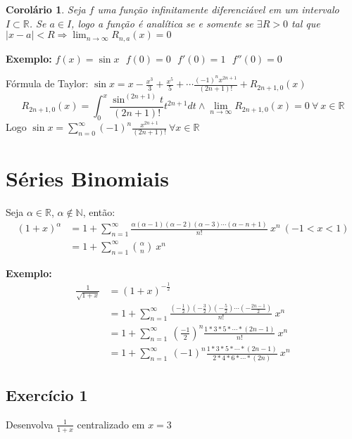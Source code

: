 \documentclass[12pt,openany, letterpaper]{book}
\newtheorem{corollary}{Corolário}[theorem]
\newcommand{\LI}[1][n]{\lim_{{#1} \rightarrow \infty}}
\newcommand{\soma}[2][n]{\sum_{{#1} = #2}^\infty}
\newcommand{\E}[1]{Exercício #1}
\begin{document}
{{\begin{corollary}
Seja $f$ uma função infinitamente diferenciável em um intervalo $I \subset \mathds{R}$. Se $a \in I$, logo a função é analítica se e somente se $\exists R > 0$ tal que $|x-a| < R \Rightarrow \LI R_{n,a} (x) = 0$
\end{corollary}

\textbf{Exemplo:} $f(x) = \sin x \ \ \ f(0) = 0 \ \ \ f'(0) = 1 \ \ \ f''(0) = 0$ 

Fórmula de Taylor: $\displaystyle{\sin x = x - \frac{x^3}{3} + \frac{x^5}{5} + \cdots \frac{(-1)^n x^{2n+1}}{(2n+1)!} + R_{2n+1,0}(x)}$ $$R_{2n+1, 0}(x) = \int_0^x \frac{\sin^{(2n+1)}t}{(2n+1)!}t^{2n+1}dt \land \LI R_{2n+1,0}(x) = 0 \ \forall \ x \in \mathds{R}$$ Logo $\displaystyle{\sin x = \soma{0} (-1)^n \frac{x^{2n+1}}{(2n+1)!}} \ \forall x \in \mathds{R}$

\section{Séries Binomiais}

Seja $\alpha \in \mathds{R}$, $\alpha \notin \mathds{N}$, então: \begin{align*}
(1+x)^\alpha &= 1 + \soma{1} \frac{\alpha(\alpha - 1) (\alpha - 2) (\alpha - 3) \cdots (\alpha -n + 1)}{n!} \ x^n \ (-1 < x < 1) \\
&= 1 + \soma{1} {\alpha \choose n} \ x^n
\end{align*}

\textbf{Exemplo:} \begin{align*}
    \frac{1}{\sqrt{1+x}} &= (1+x)^{-\frac{1}{2}} \\
    &= 1 + \soma{1} \frac{\left(-\frac{1}{2}\right) \left(-\frac{3}{2}\right) \left(-\frac{5}{2}\right) \cdots \left(-\frac{2n-1}{2}\right)}{n!} \ x^n \\
    &= 1 + \soma{1} \ \left(\frac{-1}{2}\right)^n \frac{1 * 3 * 5 * \cdots * (2n-1)}{n!} \ x^n \\
    &= 1 + \soma{1} \ (-1)^n \frac{1*3*5*\cdots*(2n-1)}{2*4*6*\cdots*(2n)} \ x^n
\end{align*}

\subsection*{\E 1} Desenvolva $\displaystyle{\frac{1}{1+x}}$ centralizado em $x=3$

}}
\end{document}
